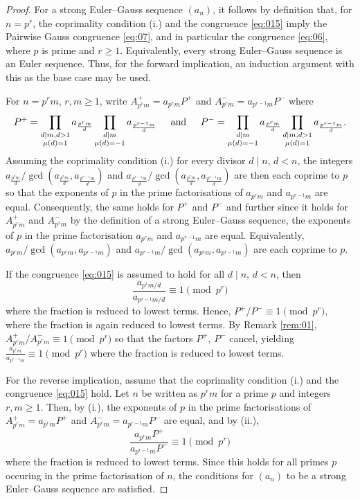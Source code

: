 \documentclass{article}
\numberwithin{equation}{section}
\theoremstyle{definition}
\begin{document}
\begin{proof}
    For a strong Euler--Gauss sequence $(a_n)$, it follows by definition that, for $n=p^r$, the coprimality condition (i.) and the congruence \eqref{eq:015} imply the Pairwise Gauss congruence \eqref{eq:07}, and in particular the congruence \eqref{eq:06}, where $p$ is prime and $r\geq1$. Equivalently, every strong Euler--Gauss sequence is an Euler sequence. Thus, for the forward implication, an induction argument with this as the base case may be used.
    
    For $n=p^rm$, $r,m\geq1$, write 
    $A_{p^rm}^+=a_{p^rm}P^+$ and $A_{p^rm}^-=a_{p^{r-1}m}P^-$
    where \[P^+=\prod_{\substack{d\mid m, d>1\\\mu(d)=1}} a_\frac{p^rm}{d}\prod_{\substack{d\mid m \\\mu(d)=-1}} a_\frac{p^{r-1}m}{d}\hspace{4mm}\text{ and }\hspace{4mm}P^-=\prod_{\substack{d\mid m \\\mu(d)=-1}} a_\frac{p^{r}m}{d}\prod_{\substack{d\mid m, d>1\\\mu(d)=1}} a_\frac{p^{r-1}m}{d}.\]
    Assuming the coprimality condition (i.) for every divisor $d \mid n$, $d<n$, the integers $a_{\frac{p^rm}{d}}/\gcd(a_{\frac{p^rm}{d}}, a_{\frac{p^{r-1}m}{d}})$ and  $a_{\frac{p^{r-1}m}{d}}/\gcd(a_{\frac{p^rm}{d}}, a_{\frac{p^{r-1}m}{d}})$ are then each coprime to $p$ so that the exponents of $p$ in the prime factorisations of $a_{p^rm}$ and $a_{p^{r-1}m}$ are equal. Consequently, the same holds for $P^+$ and $P^-$ and further since it holds for $A_{p^rm}^+$ and $A_{p^rm}^-$ by the definition of a strong Euler--Gauss sequence,  the exponents of $p$ in the prime factorisation $a_{p^rm}$ and $a_{p^{r-1}m}$ are equal. Equivalently, $a_{p^rm}/\gcd(a_{p^rm}, a_{p^{r-1}m})$ and  $a_{p^{r-1}m}/\gcd(a_{p^rm}, a_{p^{r-1}m})$ are each coprime to $p$. 

    If the congruence \eqref{eq:015} is assumed to hold for all $d\mid n$, $d<n$, then \[\frac{a_{p^rm/d}}{a_{p^{r-1}m/d}}\equiv1\pmod{p^r}\] where the fraction is reduced to lowest terms. Hence, $P^+/P^-\equiv1\pmod{p^r}$, where the fraction is again reduced to lowest terms. By Remark \ref{rem:01},  $A_{p^rm}^+/A_{p^rm}^-\equiv1\pmod{p^r}$ so that the factors $P^+$, $P^-$ cancel, yielding $\frac{a_{p^rm}}{a_{p^{r-1}m}}\equiv1\pmod{p^r}$ where the fraction is reduced to lowest terms.  

    For the reverse implication, assume that the coprimality condition (i.) and the congruence \eqref{eq:015} hold. Let $n$ be written as $p^rm$ for a prime $p$ and integers $r,m\geq1$. Then, by (i.), the exponents of $p$ in the prime factorisations of  $A_{p^rm}^+=a_{p^rm}P^+$ and $A_{p^rm}^-=a_{p^{r-1}m}P^-$ are equal, and by (ii.), \[\frac{a_{p^rm}P^+}{a_{p^{r-1}m}P^-}\equiv1\pmod{p^r}\] where the fraction is reduced to lowest terms. Since this holds for all primes $p$ occuring in the prime factorisation of $n$, the conditions for $(a_n)$ to be a strong Euler--Gauss sequence are satisfied.
\end{proof} 
\end{document}
